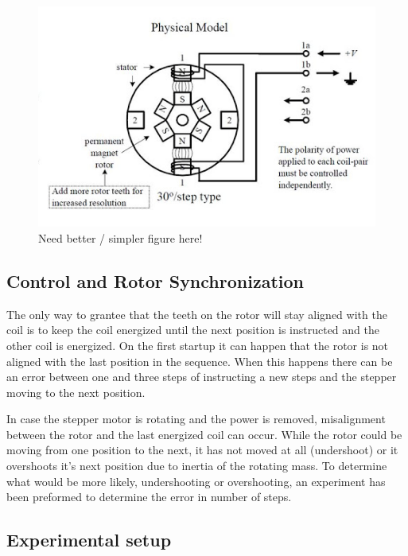 \begin{figure}
	\centering
	\includegraphics[width=\textwidth]{pics/bipolar_stepper.png}
	\caption{Need better / simpler figure here!}
	\label{fig:bipolarstepper}
\end{figure}

\subsection{Control and Rotor Synchronization}

The only way to grantee that the teeth on the rotor will stay aligned with the coil is to keep the coil energized until the next position is instructed and the other coil is energized. 
On the first startup it can happen that the rotor is not aligned with the last position in the sequence.
When this happens there can be an error between one and three steps of instructing a new steps and the stepper moving to the next position.

In case the stepper motor is rotating and the power is removed, misalignment between the rotor and the last energized coil can occur.
While the rotor could be moving from one position to the next, it has not moved at all (undershoot) or it overshoots it's next position due to inertia of the rotating mass. 
To determine what would be more likely, undershooting or overshooting, an experiment has been preformed to determine the error in number of steps.

\subsection{Experimental setup}

